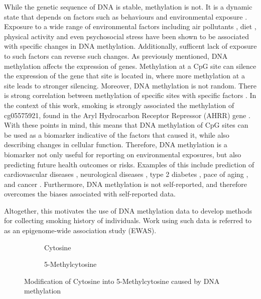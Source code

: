 \documentclass{article}
\begin{document}
While the genetic sequence of DNA is stable, methylation is not. It is a dynamic state that depends on factors such as behaviours and environmental exposure \cite{greenberg2019diverse}. Exposure to a wide range of environmental factors including air pollutants \cite{martin2018environmental}, diet \cite{ma2020whole}, physical activity and even psychosocial stress \cite{opsasnick2024epigenome} have been shown to be associated with specific changes in DNA methylation. Additionally, sufficent lack of exposure to such factors can reverse such changes. As previously mentioned, DNA methylation affects the expression of genes. Methylation at a CpG site can silence the expression of the gene that site is located in, where more methylation at a site leads to stronger silencing. Moreover, DNA methylation is not random. There is strong correlation between methylation of specific sites with specific factors \cite{ewasatlas}. In the context of this work, smoking is strongly associated the methylation of cg05575921, found in the Aryl Hydrocarbon Receptor
Repressor (AHRR) gene \cite{reynolds2015dna}. With these points in mind, this means that DNA methylation of CpG sites can be used as a biomarker indicative of the factors that caused it, while also describing changes in cellular function. Therefore, DNA methylation is a biomarker not only useful for reporting on environmental exposures, but also predicting future health outcomes or risks. Examples of this include prediction of cardiovascular diseases \cite{cameron2023dna}, neurological diseases \cite{cells11213439}, type 2 diabetes \cite{cheng2023development}, pace of aging \cite{10.7554/eLife.73420}, and cancer \cite{luo2020circulating}. Furthermore, DNA methylation is not self-reported, and therefore overcomes the biases associated with self-reported data.

Altogether, this motivates the use of DNA methylation data to develop methods for collecting smoking history of individuals. Work using such data is referred to as an epigenome-wide association study (EWAS).

\begin{figure}
    \begin{subfigure}{0.49\textwidth}
        \centering
        \hspace*{11mm}
        \vspace{3mm}
        \caption{Cytosine}
    \end{subfigure}
    \begin{subfigure}{0.49\textwidth}
        \centering
        \vspace{3mm}
        \caption{5-Methylcytosine}
    \end{subfigure}
    \caption*{Modification of Cytosine into 5-Methylcytosine caused by DNA methylation}
\end{figure}
\end{document}
